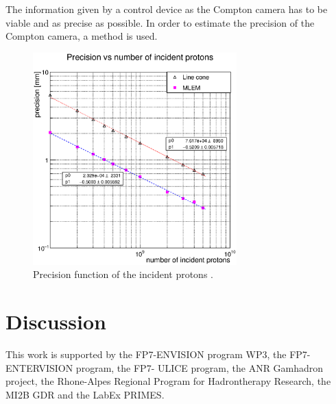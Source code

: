 \documentclass[12pt]{iopart}
\begin{document}
The information given by a control device as the Compton camera has to be viable and as precise as possible. In order to estimate the precision of the Compton camera, a method is used. 

	\begin{figure} [!hbtp]	
	\centering
	\caption{Precision function of the incident protons .}	
	\includegraphics[width=0.7\textwidth]{./Figure/Precision/2017-08-02_Precision_Comparaison_linecone_MLEM_Article_Fit.eps}
	\end{figure}




\newpage
\section{Discussion}


\newpage
\ack

This work is supported by the FP7-ENVISION program WP3, the FP7-ENTERVISION program, the FP7- ULICE program, the ANR Gamhadron project, the Rhone-Alpes Regional Program for Hadrontherapy Research, the MI2B GDR and the LabEx PRIMES.\newline



\end{document}
